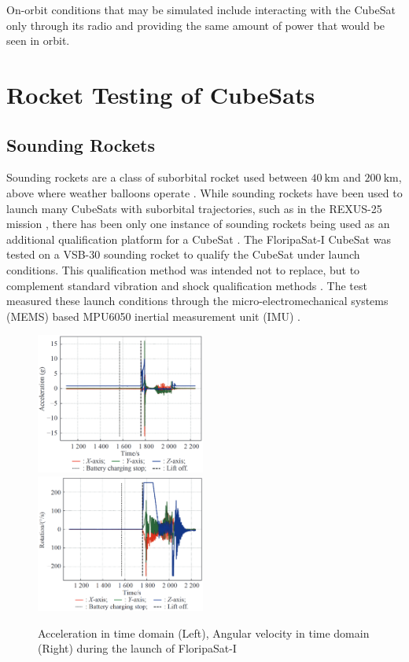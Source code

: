 \documentclass{report}
\begin{document}
On-orbit conditions that may be simulated include interacting with the CubeSat only through its radio and providing the same amount of power that would be seen in orbit.

\section{Rocket Testing of CubeSats}
\subsection{Sounding Rockets}
Sounding rockets are a class of suborbital rocket used between $\SI{40}{\kilo\metre}$ and $\SI{200}{\kilo\metre}$, above where weather balloons operate \cite{seibert2006history}. While sounding rockets have been used to launch many CubeSats with suborbital trajectories, such as in the REXUS-25 mission \cite{pont2019rexus}, there has been only one instance of sounding rockets being used as an additional qualification platform for a CubeSat \cite{slongo2019pre}. The FloripaSat-I CubeSat was tested on a VSB-30 sounding rocket \cite{slongo2019pre} to qualify the CubeSat under launch conditions. This qualification method was intended not to replace, but to complement standard vibration and shock qualification methods \cite{slongo2019pre}. The test measured these launch conditions through the micro-electromechanical systems (MEMS) based MPU6050 inertial measurement unit (IMU) \cite{slongo2019pre}.

\begin{figure}[H]
  \includegraphics[width=0.495\textwidth]{images/floripa-accel.png}
  \includegraphics[width=0.495\textwidth]{images/floripa-rot.png}
  \caption{Acceleration in time domain (Left), Angular velocity in time domain (Right) during the launch of FloripaSat-I \cite{9316404}}
  \label{fig:accel-rot}
\end{figure}
\end{document}
